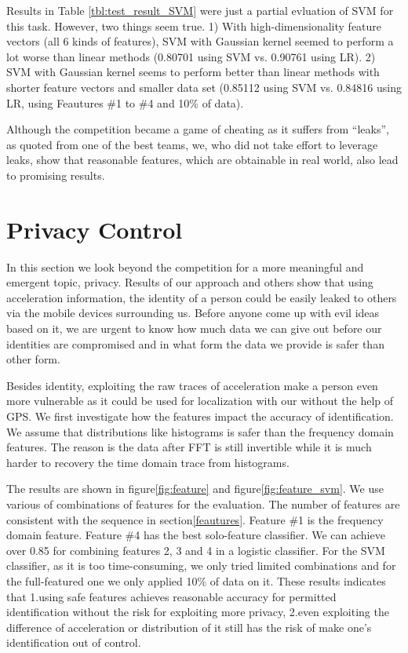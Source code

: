 \documentclass{article} %
\begin{document}
Results in Table \ref{tbl:test_result_SVM} were just a partial evluation of SVM for this task. However, two things seem true. 1) With high-dimensionality feature vectors (all 6 kinds of features), SVM with Gaussian kernel seemed to perform a lot worse than linear methods (0.80701 using SVM vs. 0.90761 using LR). 2) SVM with Gaussian kernel seems to perform better than linear methods with shorter feature vectors and smaller data set (0.85112 using SVM vs. 0.84816 using LR, using Feautures \#1 to \#4 and 10\% of data).

Although the competition became a game of cheating as it suffers from ``leaks'', as quoted from one of the best teams, we, who did not take effort to leverage leaks, show that reasonable features, which are obtainable in real world, also lead to promising results.


\section{Privacy Control}
In this section we look beyond the competition for a more meaningful and emergent topic, privacy. Results of our approach and others show that using acceleration information, the identity of a person could be easily leaked to others via the mobile devices surrounding us. Before anyone come up with evil ideas based on it, we are urgent to know how much data we can give out before our identities are compromised and in what form the data we provide is safer than other form.

Besides identity, exploiting the raw traces of acceleration make a person even more vulnerable as it could be used for localization with our without the help of GPS. We first investigate how the features impact the accuracy of identification. We assume that distributions like histograms is safer than the frequency domain features. The reason is the data after FFT is still invertible while it is much harder to recovery the time domain trace from histograms. 

The results are shown in figure\ref{fig:feature} and figure\ref{fig:feature_svm}. We use various of combinations of features for the evaluation. The number of features are consistent with the sequence in section\ref{feautures}. Feature \#1 is the frequency domain feature.  Feature \#4 has the best solo-feature classifier. We can achieve over 0.85 for combining features 2, 3 and 4 in a logistic classifier. For the SVM classifier, as it is too time-consuming, we only tried limited combinations and for the full-featured one we only applied 10\% of data on it. These results indicates that 1.using safe features achieves reasonable accuracy for permitted identification without the risk for exploiting more privacy, 2.even exploiting the difference of acceleration or distribution of it still has the risk of make one's identification out of control.
\end{document}
